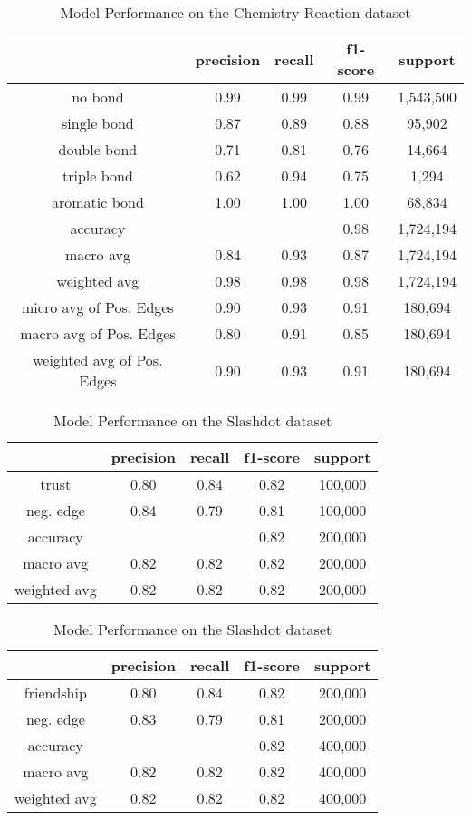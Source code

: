 \begin{table}[H]
\centering
\begin{tabular}{|c|c|c|c|c|}
\hline
 & precision & recall & f1-score & support \\ [0.5ex]
\hline\hline
no bond & 0.99 & 0.99 & 0.99 & 1,543,500  \\
single bond & 0.87 & 0.89 & 0.88 & 95,902 \\
double bond & 0.71 & 0.81 & 0.76 & 14,664 \\
triple bond & 0.62 & 0.94 & 0.75 & 1,294 \\
aromatic bond & 1.00 & 1.00 & 1.00 & 68,834 \\
\hline\hline
accuracy & & & 0.98 & 1,724,194 \\
macro avg & 0.84 & 0.93 & 0.87 & 1,724,194 \\
weighted avg & 0.98 & 0.98 & 0.98 & 1,724,194 \\
\hline
micro avg of Pos. Edges & 0.90 & 0.93 & 0.91 & 180,694 \\
macro avg of Pos. Edges & 0.80 & 0.91 & 0.85 & 180,694 \\
weighted avg of Pos. Edges & 0.90 & 0.93 & 0.91 & 180,694 \\ [0.5ex]
\hline
\end{tabular}
\caption{Model Performance on the Chemistry Reaction dataset}
\label{tab:Chem_PRF}
\end{table}
\begin{table}[H]
\setlength{\tabcolsep}{5pt}
\parbox{.5\linewidth}{
\centering
\begin{tabular}{|c|c|c|c|c|}
\hline
 & precision & recall & f1-score & support \\ [0.5ex]
\hline\hline
trust & 0.80 & 0.84 & 0.82 & 100,000  \\
neg. edge & 0.84 & 0.79 & 0.81 & 100,000 \\
\hline\hline
accuracy & & & 0.82 & 200,000 \\
macro avg & 0.82 & 0.82 & 0.82 & 200,000 \\
weighted avg & 0.82 & 0.82 & 0.82 & 200,000 \\ [0.5ex]
\hline
\end{tabular}
\caption{Model Performance on the Epinions dataset}
\label{tab:Epinions_PRF}
}
\hfill
\parbox{.5\linewidth}{
\centering
\begin{tabular}{|c|c|c|c|c|}
\hline
 & precision & recall & f1-score & support \\ [0.5ex]
\hline\hline
friendship & 0.80 & 0.84 & 0.82 & 200,000  \\
neg. edge & 0.83 & 0.79 & 0.81 & 200,000 \\
\hline\hline
accuracy & & & 0.82 & 400,000 \\
macro avg & 0.82 & 0.82 & 0.82 & 400,000 \\
weighted avg & 0.82 & 0.82 & 0.82 & 400,000 \\ [0.5ex]
\hline
\end{tabular}
\caption{Model Performance on the Slashdot dataset}
\label{tab:Slashdot_PRF}
}
\end{table}
